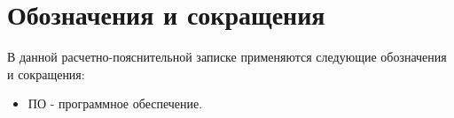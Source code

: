 \chapter*{Обозначения и сокращения}
В данной расчетно-пояснительной записке применяются следующие обозначения и сокращения:
\begin{itemize}
	\item ПО - программное обеспечение.
\end{itemize}